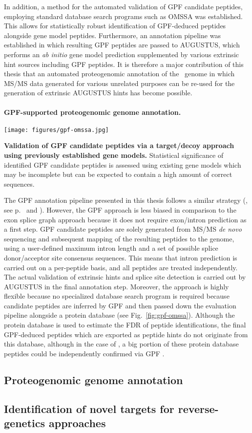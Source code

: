 In addition, a method for the automated validation of GPF candidate peptides,
employing standard database search programs such as OMSSA was established.
This allows for statistically robust identification of GPF-deduced peptides
alongside gene model peptides.
Furthermore, an annotation pipeline was established in which resulting GPF
peptides are passed to AUGUSTUS, which performs an {\em ab initio} gene 
model prediction supplemented by various extrinsic hint sources including
GPF peptides.
It is therefore a major contribution of this thesis that an automated
proteogenomic annotation of the \cre~genome in which MS/MS data generated
for various unrelated purposes can be re-used for the generation of
extrinsic AUGUSTUS hints has become possible.

\paragraph{GPF-supported proteogenomic genome annotation.}

\begin{SCtopfig}
\texttt{[image: figures/gpf-omssa.jpg]}
\caption{
{\bf Validation of GPF candidate peptides via a target/decoy approach
    using previously established gene models.} 
    Statistical significance of identified GPF candidate peptides is 
    assessed using existing gene models which may be incomplete but
    can be expected to contain a high amount of correct sequences.
}
\label{fig:gpf-omssa}
\end{SCtopfig}

The GPF annotation pipeline presented in this thesis follows a similar strategy
(\cite{Specht2011_GPF}, see p.~\pageref{section:gpf} and \pageref{paper:gpf}).
However, the GPF approach is less biased in comparison to the exon splice graph
approach because it does not require exon/intron prediction as a first step.
GPF candidate peptides are solely generated from MS/MS {\em de novo} sequencing
and subsequent mapping of the resulting peptides to the genome, using 
a user-defined maximum intron length and a set of possible splice donor/acceptor 
site consensus sequences.
This means that intron prediction is carried out on a per-peptide basis, and
all peptides are treated independently.
The actual validation of extrinsic hints and splice site detection is
carried out by AUGUSTUS in the final annotation step.
Moreover, the approach is highly flexible because no specialized database
search program is required because candidate peptides are inferred by GPF
and then passed down the evaluation pipeline alongside a protein database
(see Fig.~\ref{fig:gpf-omssa}).
Although the protein database is used to estimate the FDR of peptide 
identifications, the final GPF-deduced peptides which are exported as
peptide hints do not originate from this database, although in the case
of \cre, a big portion of these protein database peptides could be 
independently confirmed via GPF \citep{Specht2011_GPF}.


\subsection{Proteogenomic genome annotation}

\subsection{Identification of novel targets for reverse-genetics approaches}
